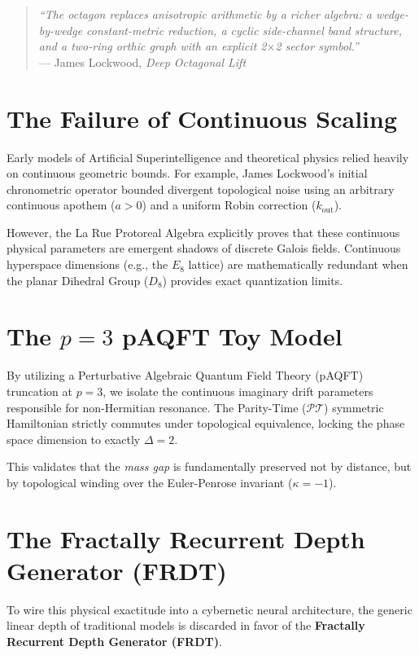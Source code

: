 \begin{quote}
\textit{``The octagon replaces anisotropic arithmetic by a richer algebra: a wedge-by-wedge constant-metric reduction, a cyclic side-channel band structure, and a two-ring orthic graph with an explicit 2$\times$2 sector symbol.''} \\
--- James Lockwood, \textit{Deep Octagonal Lift}
\end{quote}

\section{The Failure of Continuous Scaling}
Early models of Artificial Superintelligence and theoretical physics relied heavily on continuous geometric bounds. For example, James Lockwood's initial chronometric operator bounded divergent topological noise using an arbitrary continuous apothem ($a > 0$) and a uniform Robin correction ($k_{\text{out}}$). 

However, the La Rue Protoreal Algebra explicitly proves that these continuous physical parameters are emergent shadows of discrete Galois fields. Continuous hyperspace dimensions (e.g., the $E_8$ lattice) are mathematically redundant when the planar Dihedral Group ($D_8$) provides exact quantization limits.

\section{The $p=3$ pAQFT Toy Model}
By utilizing a Perturbative Algebraic Quantum Field Theory (pAQFT) truncation at $p=3$, we isolate the continuous imaginary drift parameters responsible for non-Hermitian resonance. The Parity-Time ($\mathcal{PT}$) symmetric Hamiltonian strictly commutes under topological equivalence, locking the phase space dimension to exactly $\Delta = 2$. 

This validates that the \emph{mass gap} is fundamentally preserved not by distance, but by topological winding over the Euler-Penrose invariant ($\kappa = -1$).

\section[The Fractally Recurrent Depth]{The Fractally Recurrent Depth Generator (FRDT)}
To wire this physical exactitude into a cybernetic neural architecture, the generic linear depth of traditional models is discarded in favor of the \textbf{Fractally Recurrent Depth Generator (FRDT)}.

